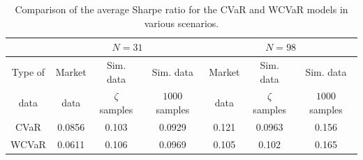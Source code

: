 \documentclass[12pt]{article}
\numberwithin{equation}{section}
\begin{document}
\begin{table}[!h]
\centering
\small
\captionsetup{justification=centering}
\begin{tabular}{|c|c|c|c|c|c|c|}
\hline
\multirow{2}{*}{} $N$ &
\multicolumn{3}{c|}{$N=31$} &
\multicolumn{3}{c|}{$N=98$}  \\
\hline
Type of & Market & Sim. data & Sim. data & Market & Sim. data & Sim. data \\
data & data & $\zeta$ samples & $1000$ samples & data & $\zeta$ samples & $1000$ samples \\
\hline
CVaR & 0.0856 & 0.103 & 0.0929 & 0.121 & 0.0963 & 0.156 \\
\hline
WCVaR & 0.0611 & 0.106 & 0.0969 & 0.105 & 0.102 & 0.165 \\
\hline
\end{tabular}
\caption{Comparison of the average Sharpe ratio for the CVaR and WCVaR models in various scenarios.}
\label{tab:cvar_conc}
\end{table}
\end{document}
